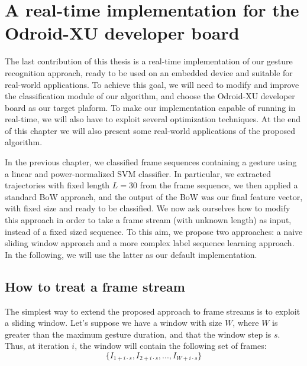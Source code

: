 
\chapter{A real-time implementation for the Odroid-XU developer board}


The last contribution of this thesis is a real-time implementation of our gesture recognition approach, ready to be used on an embedded device and suitable for real-world applications. To achieve this goal, we will need to modify and improve the classification module of our algorithm, and choose the Odroid-XU developer board as our target plaform. To make our implementation capable of running in real-time, we will also have to exploit several optimization techniques. At the end of this chapter we will also present some real-world applications of the proposed algorithm.

In the previous chapter, we classified frame sequences containing a gesture using a linear and power-normalized SVM classifier. In particular, we extracted trajectories with fixed length $L=30$ from the frame sequence, we then applied a standard BoW approach, and the output of the BoW was our final feature vector, with fixed size and ready to be classified. We now ask ourselves how to modify this approach in order to take a frame stream (with unknown length) as input, instead of a fixed sized sequence. To this aim, we propose two approaches: a naive sliding window approach and a more complex label sequence learning approach. In the following, we will use the latter as our default implementation.

\section{How to treat a frame stream}
The simplest way to extend the proposed approach to frame streams is to exploit a sliding window. Let's suppose we have a window with size $W$, where $W$ is greater than the maximum gesture duration, and that the window step is $s$. Thus, at iteration $i$, the window will contain the following set of frames:
\begin{equation}
\{ I_{1+i\cdot s}, I_{2+i \cdot s}, ..., I_{W+i \cdot s} \}
\end{equation}

